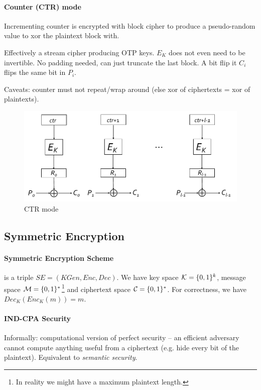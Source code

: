 \paragraph{Counter (CTR) mode}
Incrementing counter is encrypted with block cipher to produce a pseudo-random value to xor the plaintext block with.

Effectively a stream cipher producing OTP keys.
$E_K$ does not even need to be invertible.
No padding needed, can just truncate the last block.
A bit flip it $C_i$ flips the same bit in $P_i$.

Caveats: counter must not repeat/wrap around (else xor of ciphertexts = xor of plaintexts).

\begin{figure}[h]
    \centering
	\includegraphics[scale=0.4]{images/ctr.png}
    \caption{CTR mode}
    \label{fig:ctr}
\end{figure}



\subsection{Symmetric Encryption}

\paragraph{Symmetric Encryption Scheme}
is a triple $ SE = (KGen, Enc, Dec) $.
We have key space $\mathcal{K} = \lbrace 0, 1 \rbrace^k$, message space $\mathcal{M} = \lbrace 0, 1 \rbrace^*$\footnote{In reality we might have a maximum plaintext length.} and ciphertext space $\mathcal{C} = \lbrace 0, 1 \rbrace^*$.
For correctness, we have $ Dec_K(Enc_K(m))=m $.

\paragraph{IND-CPA Security}
Informally:
computational version of perfect security --
an efficient adversary cannot compute anything useful from a ciphertext (e.g. hide every bit of the plaintext).
Equivalent to \emph{semantic security}.

